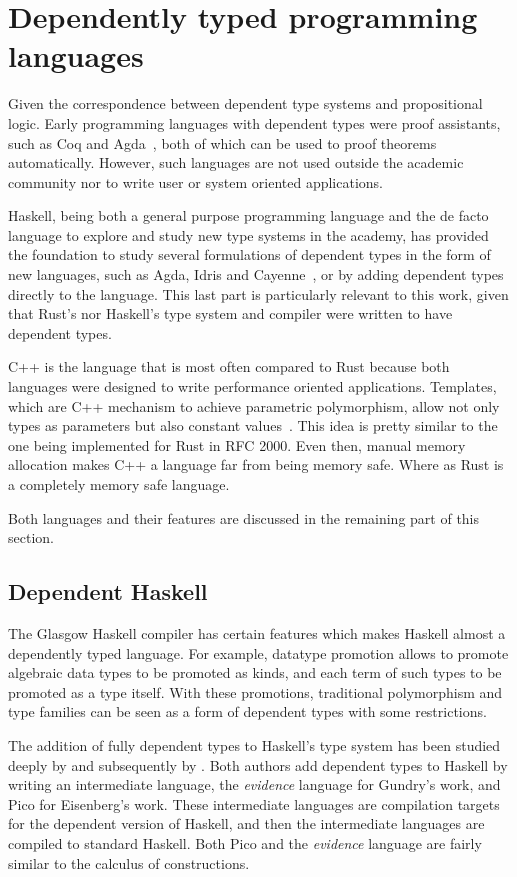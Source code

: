 \section{Dependently typed programming languages}

Given the correspondence between dependent type systems and propositional logic.
Early programming languages with dependent types were proof assistants, such as
Coq and Agda~\cite{agda}, both of which can be
used to proof theorems automatically.  However, such languages are not used
outside the academic community nor to write user or system oriented
applications.

Haskell, being both a general purpose programming language and the de facto
language to explore and study new type systems in the academy, has provided the
foundation to study several formulations of dependent types in the form of new
languages, such as Agda, Idris \cite{idris} and Cayenne~\cite{cayenne}, or by
adding dependent types directly to the language. This last part is particularly
relevant to this work, given that Rust's nor Haskell's type system and compiler
were written to have dependent types.

C++ is the language that is most often compared to Rust because both languages
were designed to write performance oriented applications. Templates, which are
C++ mechanism to achieve parametric polymorphism, allow not only types as
parameters but also constant values~\cite{templates}. This idea is pretty
similar to the one being implemented for Rust in RFC 2000. Even then, manual
memory allocation makes C++ a language far from being memory safe. Where as Rust
is a completely memory safe language.    

Both languages and their features are discussed in the remaining part of this
section.

\subsection{Dependent Haskell} 

The Glasgow Haskell compiler has certain features which makes Haskell almost a
dependently typed language. For example, datatype promotion allows to promote
algebraic data types to be promoted as kinds, and each term of such types to be
promoted as a type itself. With these promotions, traditional polymorphism and
type families can be seen as a form of dependent types with some restrictions.

The addition of fully dependent types to Haskell's type system has been studied
deeply by \citet{gundry} and subsequently by \citet{eisenberg}.  Both authors
add dependent types to Haskell by writing an intermediate language, the
\textit{evidence} language for Gundry's work, and Pico for Eisenberg's work.
These intermediate languages are compilation targets for the dependent version
of Haskell, and then the intermediate languages are compiled to standard
Haskell. Both Pico and the \textit{evidence} language are fairly similar to the
calculus of constructions.

